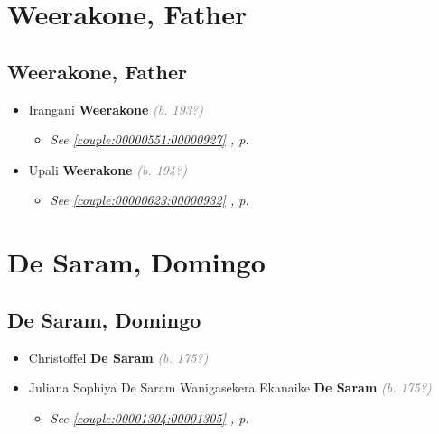 \documentclass[10pt, openany]{book}
\begin{document}
\part{Weerakone, Father}
\chapter{Weerakone, Father}
\label{00000923}
\textcolor{slmaroon}{\textit{}}
\begin{itemize}
\item{Irangani \textbf{Weerakone} \textcolor{gray}{\textit{(b. 193?)}}
\begin{itemize}
\item{\textcolor{slteal}{\textit{See  \autoref{couple:00000551:00000927} \textit{, p. \pageref{couple:00000551:00000927} }}}}
\end{itemize}
 }
\item{Upali \textbf{Weerakone} \textcolor{gray}{\textit{(b. 194?)}}
\begin{itemize}
\item{\textcolor{slteal}{\textit{See  \autoref{couple:00000623:00000932} \textit{, p. \pageref{couple:00000623:00000932} }}}}
\end{itemize}
 }
\end{itemize}
 
\part{De Saram, Domingo}
\chapter{De Saram, Domingo}
\label{00001306}
\textcolor{slmaroon}{\textit{}}
\begin{itemize}
\item{Christoffel \textbf{De Saram} \textcolor{gray}{\textit{(b. 175?)}}
  }
\item{Juliana Sophiya De Saram Wanigasekera Ekanaike \textbf{De Saram} \textcolor{gray}{\textit{(b. 175?)}}
\begin{itemize}
\item{\textcolor{slteal}{\textit{See  \autoref{couple:00001304:00001305} \textit{, p. \pageref{couple:00001304:00001305} }}}}
\end{itemize}
       }
\end{itemize}
  
\end{document}
